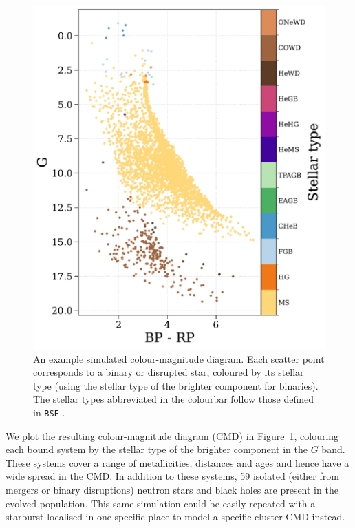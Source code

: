 \documentclass[twocolumn, twocolappendix, oneside, linenumbers]{aastex631}
\begin{document}
\begin{figure}
    \centering
    \includegraphics[width=\columnwidth]{figures/gaia-cmd.pdf}
    \caption{An example simulated \gaia colour-magnitude diagram. Each scatter point corresponds to a binary or disrupted star, coloured by its stellar type (using the stellar type of the brighter component for binaries). The stellar types abbreviated in the colourbar follow those defined in \texttt{BSE} \citep[see Section 4 of][]{Hurley+2000:2000MNRAS.315..543H}.}
    \label{fig:gaia-cmd}
\end{figure}

We plot the resulting colour-magnitude diagram (CMD) in Figure~\ref{fig:gaia-cmd}, colouring each bound system by the stellar type of the brighter component in the $G$ band. These systems cover a range of metallicities, distances and ages and hence have a wide spread in the CMD. In addition to these systems, 59 isolated (either from mergers or binary disruptions) neutron stars and black holes are present in the evolved population. This same simulation could be easily repeated with a starburst localised in one specific place to model a specific cluster CMD instead.
\end{document}
